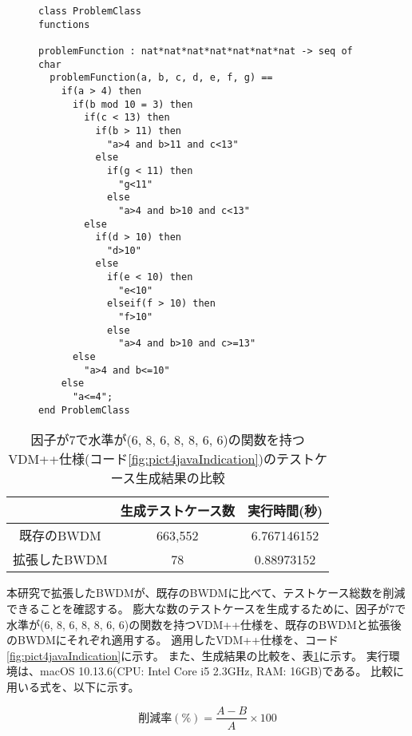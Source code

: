 \documentclass[uplatex, report, a4j, 10pt]{jsbook}
\begin{document}
\lstset{language=}
\begin{figure}[tp]
  \begin{lstlisting}[caption={因子が7で水準が$(6, 8, 6, 8, 8, 6, 6)$の関数を持つVDM++仕様},label=fig:pict4javaIndication]
class ProblemClass
functions

problemFunction : nat*nat*nat*nat*nat*nat*nat -> seq of char
  problemFunction(a, b, c, d, e, f, g) ==
    if(a > 4) then
      if(b mod 10 = 3) then
        if(c < 13) then
          if(b > 11) then
            "a>4 and b>11 and c<13"
          else
            if(g < 11) then
              "g<11"
            else
              "a>4 and b>10 and c<13"
        else
          if(d > 10) then
            "d>10"
          else
            if(e < 10) then
              "e<10"
            elseif(f > 10) then
              "f>10"
            else
              "a>4 and b>10 and c>=13"
      else
        "a>4 and b<=10"
    else
      "a<=4";
end ProblemClass
\end{lstlisting}
\end{figure}

\begin{table}[tp]
  \begin{center}
    \caption{因子が7で水準が(6, 8, 6, 8, 8, 6, 6)の関数を持つVDM++仕様(コード\ref{fig:pict4javaIndication})のテストケース生成結果の比較}
    \label{tab:pict4java_result}
    \begin{tabular}{c|c|c}
                   & 生成テストケース数 & 実行時間(秒) \\
      \hline
      \hline
      既存のBWDM   & 663,552            & 6.767146152  \\ \hline
      拡張したBWDM & 78                 & 0.88973152
    \end{tabular}
  \end{center}
\end{table}

本研究で拡張したBWDMが、既存のBWDMに比べて、テストケース総数を削減できることを確認する。
膨大な数のテストケースを生成するために、因子が7で水準が(6, 8, 6, 8, 8, 6, 6)の関数を持つVDM++仕様を、既存のBWDMと拡張後のBWDMにそれぞれ適用する。
適用したVDM++仕様を、コード\ref{fig:pict4javaIndication}に示す。
また、生成結果の比較を、表\ref{tab:pict4java_result}に示す。
実行環境は、macOS 10.13.6(CPU: Intel Core i5 2.3GHz, RAM: 16GB)である。
比較に用いる式を、以下に示す。

\begin{equation}\label{equ:sakugennritu}
  削減率(\%) = \frac{A - B}{A} \times 100
\end{equation}
\end{document}
